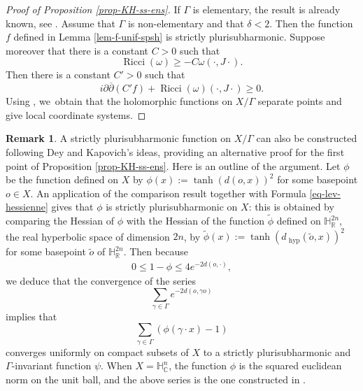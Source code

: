 \documentclass[JEP,XML,SOM,Unicode,NoEqCountersInSection,published]{cedram}
\theoremstyle{definition}
\newtheorem*{remark}{Remark}
\newcommand{\C}{\mathbb{C}}
\newcommand{\R}{\mathbb{R}}
\newcommand{\HNC}{\mathbb{H}^{n}_{\C}}
\DeclareMathOperator{\Ricci}{Ricci}
\def\C{\mathbb{C}}
\newcommand{\HNC}{\mathbb{H}^{n}_{\C}}
\begin{document}
\begin{proof}[Proof of Proposition \ref{prop-KH-ss-ens}]
If $\Gamma$ is elementary, the result is already known, see \cite[Th.\,1.1 and Proposition 1.3]{chenDiscreteGroupsHolomorphic2013}. Assume that $\Gamma$ is non-elementary and that $\delta<2$. Then the function $f$ defined in Lemma \ref{lem-f-unif-spsh} is strictly plurisubharmonic. Suppose moreover that there is a constant $C>0$ such that
\begin{equation*}
\Ricci(\omega)\ge -C\omega(\cdot,J\cdot).
\end{equation*}
Then there is a constant $C'>0$ such that
\begin{equation*}
i\partial\overline{\partial}(C'f) + \Ricci(\omega)(\cdot,J\cdot) \ge 0.
\end{equation*}
Using \cite[Prop.\,4.1]{chenDiscreteGroupsHolomorphic2013}, we~obtain that the holomorphic functions on $X/\Gamma$ separate points and give local coordinate systems.
\end{proof}

\begin{remark}A strictly plurisubharmonic function on $X/\Gamma$ can also be constructed following Dey and Kapovich's ideas, providing an alternative proof for the first point of Proposition \ref{prop-KH-ss-ens}. Here is an outline of the argument. Let $\phi$ be the function defined on $X$ by $\phi(x):=\tanh(d(o,x))^{2}$ for some basepoint $o\in X$. An application of the comparison result \cite[Th.\,A]{greeneFunctionTheoryManifolds1979} together with Formula \eqref{eq-lev-hessienne} gives that $\phi$ is strictly plurisubharmonic on $X$: this is obtained by comparing the Hessian of $\phi$ with the Hessian of the function $\widetilde{\phi}$ defined on $\mathbb{H}^{2n}_{\R}$, the real hyperbolic space of dimension $2n$, by $\widetilde{\phi}(x):= \tanh(d_{\text{ hyp}}(\widetilde{o},x))^{2}$ for some basepoint $\widetilde{o}$ of $\mathbb{H}^{2n}_{\R}$. Then because
\begin{align*}
0\leq 1-\phi \leq 4e^{-2d(o,\cdot)},
\end{align*}
we deduce that the convergence of the series
\begin{equation*}
\sum_{\gamma \in \Gamma}e^{-2d(o,\gamma o)}
\end{equation*} implies that
\begin{equation*}
\sum_{\gamma \in \Gamma}(\phi(\gamma\cdot x)-1)
\end{equation*} converges uniformly on compact subsets of $X$ to a strictly plurisubharmonic and $\Gamma$\nobreakdash-invariant function $\psi$. When $X=\HNC$, the function $\phi$ is the squared euclidean norm on the unit ball, and the above series is the one constructed in \cite{deyNoteComplexhyperbolicKleinian2020}.
\end{remark}
\end{document}
